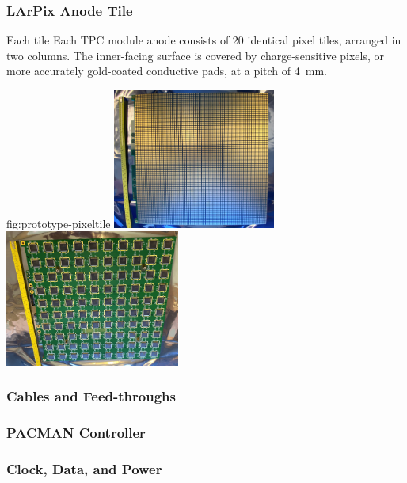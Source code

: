 

\subsubsection{LArPix Anode Tile}
\label{sec:larpix-tile}

Each tile 
Each TPC module anode consists of 20 identical pixel tiles, arranged in two columns.
The inner-facing surface is covered by charge-sensitive pixels, or more accurately gold-coated conductive pads, at a pitch of 4~mm\@.


\begin{dunefigure}{fig:prototype-pixeltile}
{}
\includegraphics[width=0.4\textwidth]{graphics/lartpc/Charge/larpix_v2_10x10tile_frontside.png}
\includegraphics[width=0.43\textwidth]{graphics/lartpc/Charge/larpix_v2_10x10tile_backside.png}
\end{dunefigure}



\subsubsection{Cables and Feed-throughs}
\label{sec:larpix-feedthroughs}

\subsubsection{PACMAN Controller}
\label{sec:larpix-control}

\subsubsection{Clock, Data, and Power}
\label{sec:larpix-clockdatapower}





